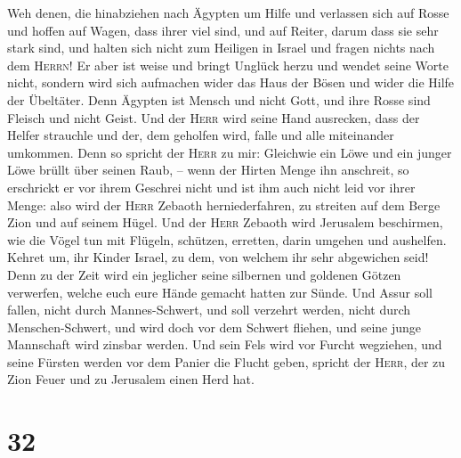  Weh denen, die hinabziehen nach Ägypten um Hilfe und
verlassen sich auf Rosse und hoffen auf Wagen, dass ihrer viel sind, und
auf Reiter, darum dass sie sehr stark sind, und halten sich nicht zum
Heiligen in Israel und fragen nichts nach dem \textsc{Herrn}!
 Er aber ist weise und bringt Unglück herzu und wendet
seine Worte nicht, sondern wird sich aufmachen wider das Haus der Bösen
und wider die Hilfe der Übeltäter.  Denn Ägypten ist
Mensch und nicht Gott, und ihre Rosse sind Fleisch und nicht Geist. Und
der \textsc{Herr} wird seine Hand ausrecken, dass der Helfer strauchle
und der, dem geholfen wird, falle und alle miteinander umkommen.
 Denn so spricht der \textsc{Herr} zu mir: Gleichwie ein
Löwe und ein junger Löwe brüllt über seinen Raub, -- wenn der Hirten
Menge ihn anschreit, so erschrickt er vor ihrem Geschrei nicht und ist
ihm auch nicht leid vor ihrer Menge: also wird der \textsc{Herr} Zebaoth
herniederfahren, zu streiten auf dem Berge Zion und auf seinem Hügel.
 Und der \textsc{Herr} Zebaoth wird Jerusalem beschirmen,
wie die Vögel tun mit Flügeln, schützen, erretten, darin umgehen und
aushelfen.  Kehret um, ihr Kinder Israel, zu dem, von
welchem ihr sehr abgewichen seid!  Denn zu der Zeit wird
ein jeglicher seine silbernen und goldenen Götzen verwerfen, welche euch
eure Hände gemacht hatten zur Sünde.  Und Assur soll
fallen, nicht durch Mannes-Schwert, und soll verzehrt werden, nicht
durch Menschen-Schwert, und wird doch vor dem Schwert fliehen, und seine
junge Mannschaft wird zinsbar werden.  Und sein Fels wird
vor Furcht wegziehen, und seine Fürsten werden vor dem Panier die Flucht
geben, spricht der \textsc{Herr}, der zu Zion Feuer und zu Jerusalem
einen Herd hat.

\hypertarget{section-31}{%
\section{32}\label{section-31}}

